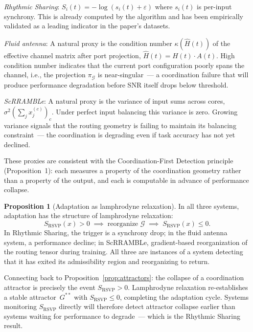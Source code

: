 \documentclass[11pt, a4paper]{article}
\theoremstyle{definition}
\newtheorem{proposition}{Proposition}
\theoremstyle{remark}
\begin{document}
\textit{Rhythmic Sharing}: $S_i(t) = -\log(s_i(t) + \varepsilon)$ where
$s_i(t)$ is per-input synchrony. This is already computed by the algorithm
and has been empirically validated as a leading indicator in the paper's
datasets.

\textit{Fluid antenna}: A natural proxy is the condition number
$\kappa(\hat{H}(t))$ of the effective channel matrix after port projection,
$\hat{H}(t) = H(t) \cdot A(t)$. High condition number indicates that the
current port configuration poorly spans the channel, i.e., the projection
$\pi_{\mathcal{G}}$ is near-singular~--- a coordination failure that will
produce performance degradation before SNR itself drops below threshold.

\textit{ScRRAMBLe}: A natural proxy is the variance of input sums across
cores, $\sigma^2(\sum_j x_j^{(c)})_c$. Under perfect input balancing this
variance is zero. Growing variance signals that the routing geometry is
failing to maintain its balancing constraint~--- the coordination is
degrading even if task accuracy has not yet declined.

These proxies are consistent with the Coordination-First Detection
principle (Proposition~1): each measures a property of the coordination
geometry rather than a property of the output, and each is computable
in advance of performance collapse.

\begin{proposition}[Adaptation as lamphrodyne relaxation]
In all three systems, adaptation has the structure of lamphrodyne relaxation:
\[
S_{\mathrm{RSVP}}(x) > 0 \;\implies\; \text{reorganize } \mathcal{G}
\;\implies\; S_{\mathrm{RSVP}}(x) \leq 0.
\]
In Rhythmic Sharing, the trigger is a synchrony drop; in the fluid antenna
system, a performance decline; in ScRRAMBLe, gradient-based reorganization
of the routing tensor during training. All three are instances of a system
detecting that it has exited its admissibility region and reorganizing to
return.
\end{proposition}

Connecting back to Proposition~\ref{prop:attractors}: the collapse of a
coordination attractor is precisely the event $S_{\mathrm{RSVP}} > 0$.
Lamphrodyne relaxation re-establishes a stable attractor~$G^{**}$ with
$S_{\mathrm{RSVP}} \leq 0$, completing the adaptation cycle. Systems
monitoring $S_{\mathrm{RSVP}}$ directly will therefore detect attractor
collapse earlier than systems waiting for performance to degrade~--- which
is the Rhythmic Sharing result.
\end{document}
